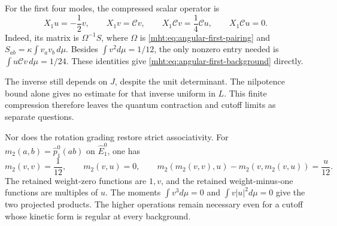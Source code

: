 For the first four modes, the compressed scalar operator is
\begin{equation}\label{mht:eq:angular-first-background}
 X_1u=-\frac12v,\qquad X_1v=\mathcal Cv,
 \qquad X_1\mathcal Cv=\frac14\mathcal Cu,
 \qquad X_1\mathcal Cu=0.
\end{equation}
Indeed, its matrix is $\Omega^{-1}S$, where $\Omega$ is
\eqref{mht:eq:angular-first-pairing} and
$S_{ab}=\kappa\int v_av_b\,d\mu$. Besides
$\int v^2d\mu=1/12$, the only nonzero entry needed is
$\int u\mathcal Cv\,d\mu=1/24$. These identities give
\eqref{mht:eq:angular-first-background} directly.

The inverse still depends on $J$, despite the unit determinant.
The nilpotence bound alone gives no estimate for that inverse
uniform in $L$. This finite compression therefore leaves the
quantum contraction and cutoff limits as separate questions.

Nor does the rotation grading restore strict associativity. For
$m_2(a,b)=\widehat p_1^0(ab)$ on $\widehat E_1^0$, one has
\[
 m_2(v,v)=\frac1{12},\qquad m_2(v,u)=0,
 \qquad
 m_2(m_2(v,v),u)-m_2(v,m_2(v,u))=\frac u{12}.
\]
The retained weight-zero functions are $1,v$, and the retained
weight-minus-one functions are multiples of $u$.
The moments $\int v^3d\mu=0$ and $\int v|u|^2d\mu=0$ give the
two projected products. The higher operations remain necessary
even for a cutoff whose kinetic form is regular at every background.
